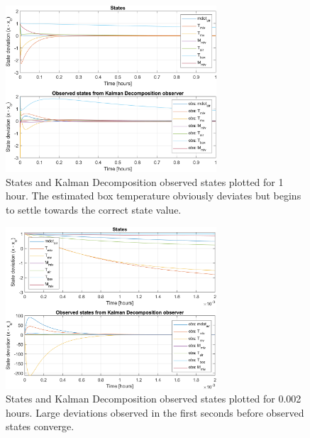\begin{figure}[h!]
	\centering
	\includegraphics[width=0.7\textwidth]{Graphics/fig_stateObsState1h.png}
	\caption{States and Kalman Decomposition observed states plotted for 1 hour. The estimated box temperature obviously deviates but begins to settle towards the correct state value.}
	\label{fig:sim_stateObsState1h}
\end{figure}

\begin{figure}[h!]
	\centering
	\includegraphics[width=0.7\textwidth]{Graphics/fig_stateObsState002h.png}
	\caption{States and Kalman Decomposition observed states plotted for 0.002 hours. Large deviations observed in the first seconds before observed states converge.}
	\label{fig:sim_stateObsState002h}
\end{figure}
